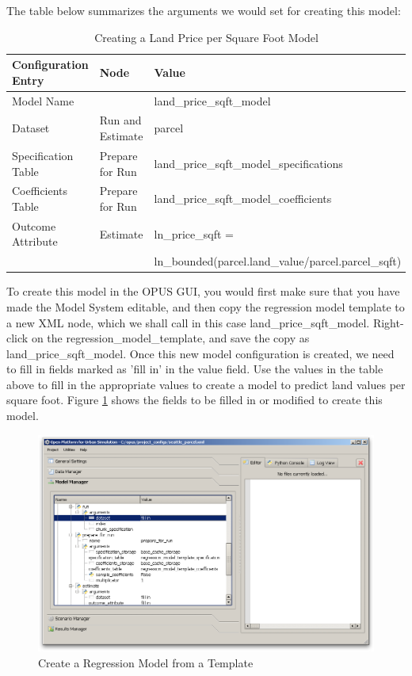 The table below summarizes the arguments we would set for creating this model:

\begin{table}[htp]
\caption{Creating a Land Price per Square Foot Model}
\label{tab:land-price-sqft-model}
\begin{center}
\begin{tabular}{ p{1.3in}  p{1.3in} p{3.0in}  }
\toprule[1.5pt]
Configuration Entry & Node & Value \\
\midrule
Model Name & & land\_price\_sqft\_model \\
Dataset & Run and Estimate & parcel \\
Specification Table & Prepare for Run & land\_price\_sqft\_model\_specifications \\
Coefficients Table & Prepare for Run & land\_price\_sqft\_model\_coefficients \\
Outcome Attribute & Estimate &ln\_price\_sqft = \\ & & ln\_bounded(parcel.land\_value/parcel.parcel\_sqft)  \\
\bottomrule
\end{tabular}
\end{center}
\end{table}

To create this model in the OPUS GUI, you would first make sure that you have made the Model System editable, and then copy the regression model template to a new XML node, which we shall call in this case land\_price\_sqft\_model.  Right-click on the regression\_model\_template, and save the copy as land\_price\_sqft\_model.  Once this new model configuration is created, we need to fill in fields marked as 'fill in' in the value field.  Use the values in the table above to fill in the appropriate values to create a model to predict land values per square foot.  Figure \ref{fig:model-regression-1} shows the fields to be filled in or modified to create this model.

\begin{figure}[htp]
\begin{center}
\includegraphics[scale=0.4]{graphics/create-regression-model.png}
\end{center}
\caption{Create a Regression Model from a Template}
\label{fig:model-regression-1}
\end{figure}

